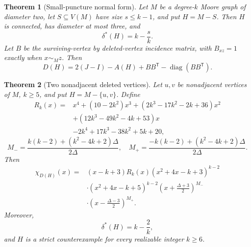 \documentclass[10pt,a4paper]{amsart}
\newtheorem{theorem}{Theorem}
\newcommand{\resultbox}[1]{\boxed{#1}}
\begin{document}
\begin{theorem}[Small-puncture normal form]\label{thm:small-puncture}
Let \(M\) be a degree-\(k\) Moore graph of diameter two, let
\(S\subseteq V(M)\) have size \(s\le k-1\), and put \(H=M-S\).  Then \(H\)
is connected, has diameter at most three, and
\[
 \resultbox{\delta^*(H)=k-\frac{s}{k}.}
\]
Let \(B\) be the surviving-vertex by deleted-vertex incidence matrix, with
\(B_{xz}=1\) exactly when \(x\sim_M z\).  Then
\[
 \resultbox{
 D(H)=2(J-I)-A(H)+BB^{\mathsf T}
 -\operatorname{diag}(BB^{\mathsf T}).
 }
\]
\end{theorem}

\begin{theorem}[Two nonadjacent deleted vertices]\label{thm:nonadjacent-puncture}
Let \(u,v\) be nonadjacent vertices of \(M\), \(k\ge5\), and put
\(H=M-\{u,v\}\).  Define
\begin{align*}
R_k(x)={}&x^4+(10-2k^2)x^3+(2k^3-17k^2-2k+36)x^2\\
&+(12k^3-49k^2-4k+53)x\\
&-2k^4+17k^3-38k^2+5k+20,
\end{align*}
\[
 M_- =\frac{k(k-2)+(k^2-4k+2)\Delta}{2\Delta},
 \quad
 M_+ =\frac{-k(k-2)+(k^2-4k+2)\Delta}{2\Delta}.
\]
Then
\begin{align*}
\chi_{D(H)}(x)={}&(x-k+3)R_k(x)
 (x^2+4x-k+3)^{k-2}\\
&\cdot(x^2+4x-k+5)^{k-2}
 \left(x+\frac{\Delta+3}{2}\right)^{M_-}\\
&\cdot\left(x-\frac{\Delta-3}{2}\right)^{M_+}.
\end{align*}
Moreover,
\[
 \delta^*(H)=k-\frac2k,
\]
and \(H\) is a strict counterexample for every realizable integer \(k\ge6\).
\end{theorem}
\end{document}
